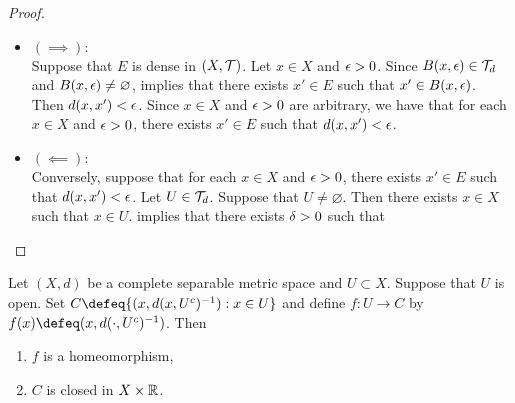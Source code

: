 \documentclass{book}
\begin{document}
\begin{proof}\
	\begin{itemize}
		\item $(\implies):$ \\
		Suppose that $E$ is dense in $(X, \mathcal{T})$. Let $x \in X$ and $\epsilon > 0$. Since $B(x, \epsilon) \in \mathcal{T}_d$ and $B(x, \epsilon) \neq \varnothing$,  implies that there exists $x' \in E$ such that $x'\in B(x, \epsilon)$. Then $d(x, x')< \epsilon$. Since $x \in X$ and $\epsilon > 0$ are arbitrary, we have that for each $x \in X$ and $\epsilon > 0$, there exists $x' \in E$ such that $d(x, x')< \epsilon$. 
		\item $(\impliedby):$ \\
		Conversely, suppose that for each $x \in X$ and $\epsilon > 0$, there exists $x' \in E$ such that $d(x, x')< \epsilon$. Let $U \in \mathcal{T}_d$. Suppose that $U \neq \varnothing$. Then there exists $x \in X$ such that $x \in U$.  implies that there exists $\delta > 0$ such that
	\end{itemize}
\end{proof}


\begin{ex} 
	Let $(X, d)$ be a complete separable metric space and $U \subset X$. Suppose that $U$ is open. 
	Set $C \defeq \{(x, d(x, U^c)^{-1}): x \in U\}$ and define $f:U \rightarrow C$ by $f(x) \defeq (x, d(\cdot, U^c)^{-1})$. Then 
	\begin{enumerate}
		\item $f$ is a homeomorphism,
		\item $C$ is closed in $X \times \mathbb{R}$.
	\end{enumerate}
\end{ex}
\end{document}
